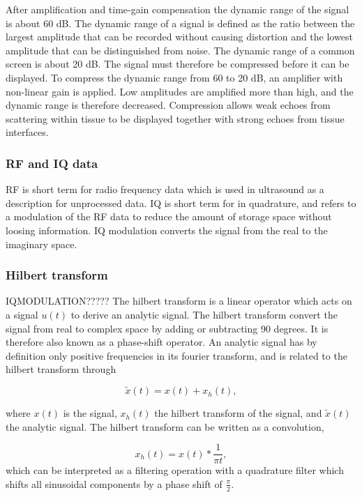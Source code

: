 After amplification and time-gain compensation the dynamic range of the signal is about 60 dB. The dynamic range of a signal is defined as the ratio between the largest amplitude that can be recorded without causing distortion and the lowest amplitude that can be distinguished from noise. The dynamic range of a common screen is about 20 dB. The signal must therefore be compressed before it can be displayed. To compress the dynamic range from 60 to 20 dB, an amplifier with non-linear gain is applied. Low amplitudes are amplified more than high, and the dynamic range is therefore decreased. Compression allows weak echoes from scattering within tissue to be displayed together with strong echoes from tissue interfaces.

\subsubsection{RF and IQ data}
RF is short term for radio frequency data which is used in ultrasound as a description for unprocessed data. IQ is short term for in quadrature, and refers to a modulation of the RF data to reduce the amount of storage space without loosing information. IQ modulation converts the signal from the real to the imaginary space.

\subsubsection{Hilbert transform}
IQMODULATION?????
The hilbert transform is a linear operator which acts on a signal $u(t)$ to derive an analytic signal. The hilbert transform convert the signal from real to complex space by adding or subtracting 90 degrees. It is therefore also known as a phase-shift operator. An analytic signal has by definition only positive frequencies in its fourier transform, and is related to the hilbert transform through 

\begin{equation}
\tilde{x}(t) = x(t) + x_h(t),
\end{equation}

where $x(t)$ is the signal, $x_h(t)$ the hilbert transform of the signal, and $\tilde{x}(t)$ the analytic signal. The hilbert transform can be written as a convolution, 

\begin{equation}
x_h(t) = x(t)*\frac{1}{\pi t},
\end{equation}
which can be interpreted as a filtering operation with a quadrature filter which shifts all sinusoidal components by a phase shift of $\frac{\pi}{2}$.

